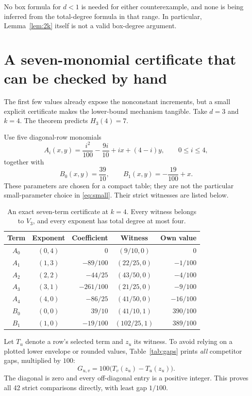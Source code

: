 \documentclass[11pt,a4paper]{article}
\numberwithin{equation}{section}
\theoremstyle{definition}
\theoremstyle{remark}
\begin{document}
No box formula for $d<1$ is needed for either counterexample, and none is
being inferred from the total-degree formula in that range. In particular,
Lemma~\ref{lem:2k} itself is not a valid box-degree argument.

\section{A seven-monomial certificate that can be checked by hand}
\label{sec:example}

The first few values already expose the nonconstant increments, but a small
explicit certificate makes the lower-bound mechanism tangible. Take $d=3$
and $k=4$. The theorem predicts $H_3(4)=7$.

Use five diagonal-row monomials
\[
A_i(x,y)=\frac{i^2}{100}-\frac{9i}{10}+ix+(4-i)y,
\qquad 0\leq i\leq4,
\]
together with
\[
B_0(x,y)=\frac{39}{10},\qquad B_1(x,y)=-\frac{19}{100}+x.
\]
These parameters are chosen for a compact table; they are not the particular
small-parameter choice in \eqref{eq:small}. Their strict witnesses are listed
below.

\begin{table}[ht]
\centering
\renewcommand{\arraystretch}{1.22}
\begin{tabular}{@{}c c r c r@{}}
\toprule
Term & Exponent & Coefficient & Witness & Own value\\
\midrule
$A_0$ & $(0,4)$ & $0$ & $(9/10,0)$ & $0$\\
$A_1$ & $(1,3)$ & $-89/100$ & $(22/25,0)$ & $-1/100$\\
$A_2$ & $(2,2)$ & $-44/25$ & $(43/50,0)$ & $-4/100$\\
$A_3$ & $(3,1)$ & $-261/100$ & $(21/25,0)$ & $-9/100$\\
$A_4$ & $(4,0)$ & $-86/25$ & $(41/50,0)$ & $-16/100$\\
$B_0$ & $(0,0)$ & $39/10$ & $(41/10,1)$ & $390/100$\\
$B_1$ & $(1,0)$ & $-19/100$ & $(102/25,1)$ & $389/100$\\
\bottomrule
\end{tabular}
\caption{An exact seven-term certificate at $k=4$. Every witness belongs to
$V_3$, and every exponent has total degree at most four.}
\label{tab:certificate}
\end{table}

Let $T_u$ denote a row's selected term and $z_u$ its witness. To avoid relying
on a plotted lower envelope or rounded values, Table~\ref{tab:gaps} prints
\emph{all} competitor gaps, multiplied by $100$:
\[
G_{u,v}=100\bigl(T_v(z_u)-T_u(z_u)\bigr).
\]
The diagonal is zero and every off-diagonal entry is a positive integer.
This proves all 42 strict comparisons directly, with least gap $1/100$.
\end{document}
